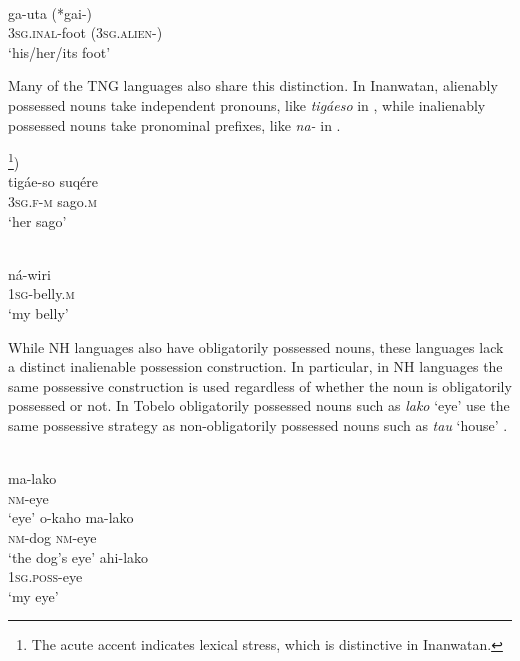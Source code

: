 \ea%
\label{ex:4:21}                                
 \\
\gll  ga-uta  (*gai-) \\
  \textsc{3sg.inal}-foot  \textsc{(3sg.alien-)} \\
\glt `his/her/its foot'
\z
 
Many of the TNG languages also share this distinction. In Inanwatan, alienably possessed nouns take independent pronouns, like \textit{tig\'aeso} in , while inalienably possessed nouns take pronominal prefixes, like \textit{na- }in .

\ea%
\label{ex:4:22}
\footnote{The acute accent indicates lexical stress, which is distinctive in Inanwatan.})\\
\gll  tig\'ae-so suq\'ere \\
  \textsc{3sg.f}-\textsc{m} sago.\textsc{m} \\
\glt `her sago'
\z





\ea%
\label{ex:4:23}
\\
\gll  n\'a-wiri \\
 \textsc{1sg}-belly.\textsc{m}  \\
\glt `my belly'
\z





While NH languages also have obligatorily possessed nouns, these languages lack a distinct inalienable possession construction. In particular, in NH languages the same possessive construction is used regardless of whether the noun is obligatorily possessed or not. In Tobelo obligatorily possessed nouns such as \textit{lako }`eye'  use the same possessive strategy as non-obligatorily possessed nouns such as \textit{tau }`house' .



\ea%
\label{ex:4:24}
 \\
\ea
  \gll ma-lako \\
    \textsc{nm}-eye  \\
\glt `eye' 
    \ex
    \gll o-kaho ma-lako \\
    \textsc{nm}-dog \textsc{nm}-eye\\
\glt `the dog's eye'
    \ex
    \gll ahi-lako\\
    \textsc{1sg.poss}-eye\\
\glt `my eye'
  \z
\z

